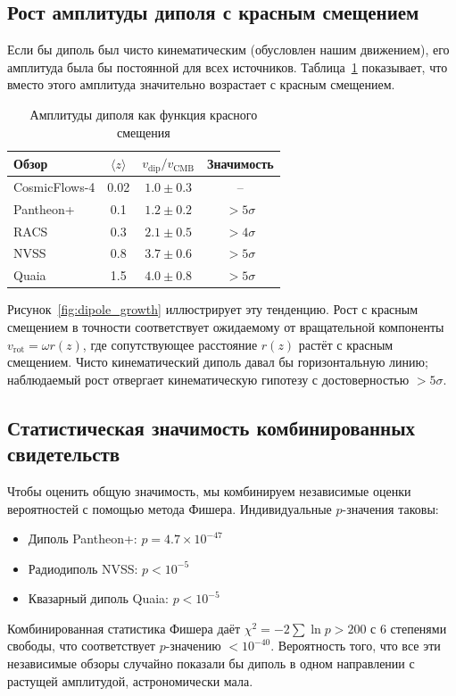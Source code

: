\documentclass[11pt,a4paper]{article}
\begin{document}
	\subsection{Рост амплитуды диполя с красным смещением}
	
	Если бы диполь был чисто кинематическим (обусловлен нашим движением), его амплитуда была бы постоянной для всех источников. Таблица~\ref{tab:dipole_amplitudes} показывает, что вместо этого амплитуда значительно возрастает с красным смещением.
	
	\begin{table}[htbp]
		\centering
		\caption{Амплитуды диполя как функция красного смещения}
		\label{tab:dipole_amplitudes}
		\begin{tabular}{lccc}
			\toprule
			\textbf{Обзор} & \(\langle z \rangle\) & \(v_{\text{dip}}/v_{\text{CMB}}\) & \textbf{Значимость} \\
			\midrule
			CosmicFlows-4 & 0.02 & \(1.0 \pm 0.3\) & -- \\
			Pantheon+ & 0.1 & \(1.2 \pm 0.2\) & \(>5\sigma\) \cite{Sah2025} \\
			RACS & 0.3 & \(2.1 \pm 0.5\) & \(>4\sigma\) \cite{Oayda2024} \\
			NVSS & 0.8 & \(3.7 \pm 0.6\) & \(>5\sigma\) \cite{Singal2024} \\
			Quaia & 1.5 & \(4.0 \pm 0.8\) & \(>5\sigma\) \cite{Secrest2025} \\
			\bottomrule
		\end{tabular}
	\end{table}
	
	Рисунок~\ref{fig:dipole_growth} иллюстрирует эту тенденцию. Рост с красным смещением в точности соответствует ожидаемому от вращательной компоненты \(v_{\mathrm{rot}} = \omega r(z)\), где сопутствующее расстояние \(r(z)\) растёт с красным смещением. Чисто кинематический диполь давал бы горизонтальную линию; наблюдаемый рост отвергает кинематическую гипотезу с достоверностью \(>5\sigma\).
	
	\subsection{Статистическая значимость комбинированных свидетельств}
	
	Чтобы оценить общую значимость, мы комбинируем независимые оценки вероятностей с помощью метода Фишера. Индивидуальные \(p\)-значения таковы:
	\begin{itemize}
		\item Диполь Pantheon+: \(p = 4.7\times10^{-47}\) \cite{Sah2025}
		\item Радиодиполь NVSS: \(p < 10^{-5}\) \cite{Singal2024}
		\item Квазарный диполь Quaia: \(p < 10^{-5}\) \cite{Secrest2025}
	\end{itemize}
	Комбинированная статистика Фишера даёт \(\chi^2 = -2\sum \ln p > 200\) с 6 степенями свободы, что соответствует \(p\)-значению \(< 10^{-40}\). Вероятность того, что все эти независимые обзоры случайно показали бы диполь в одном направлении с растущей амплитудой, астрономически мала.
	
\end{document}

